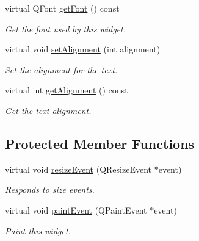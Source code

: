\begin{DoxyCompactItemize}
virtual Q\-Font \hyperlink{class_u_i_1_1_text_item_widget_a5996f149a30fe2c8468091bf53dc9f9e}{get\-Font} () const 
\begin{DoxyCompactList}\small\item\em Get the font used by this widget. \end{DoxyCompactList}\item 
virtual void \hyperlink{class_u_i_1_1_text_item_widget_ab5a1bd88be6f83f5008917af0697b154}{set\-Alignment} (int alignment)
\begin{DoxyCompactList}\small\item\em Set the alignment for the text. \end{DoxyCompactList}\item 
virtual int \hyperlink{class_u_i_1_1_text_item_widget_ae48e17ef9fdb7fd2f3974e0717a8dbcf}{get\-Alignment} () const 
\begin{DoxyCompactList}\small\item\em Get the text alignment. \end{DoxyCompactList}\end{DoxyCompactItemize}
\subsection*{Protected Member Functions}
\begin{DoxyCompactItemize}
\item 
virtual void \hyperlink{class_u_i_1_1_text_item_widget_ace2772195f51fe3e564d65d851494454}{resize\-Event} (Q\-Resize\-Event $\ast$event)
\begin{DoxyCompactList}\small\item\em Responds to size events. \end{DoxyCompactList}\item 
virtual void \hyperlink{class_u_i_1_1_text_item_widget_a3bfad6b2b383cdcfc93368a24f47c4a6}{paint\-Event} (Q\-Paint\-Event $\ast$event)
\begin{DoxyCompactList}\small\item\em Paint this widget. \end{DoxyCompactList}\end{DoxyCompactItemize}
